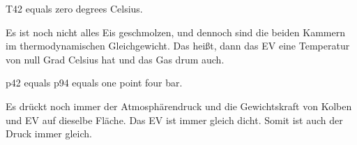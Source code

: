 T42 equals zero degrees Celsius.

Es ist noch nicht alles Eis geschmolzen, und dennoch sind die beiden Kammern im thermodynamischen Gleichgewicht. Das heißt, dann das EV eine Temperatur von null Grad Celsius hat und das Gas drum auch.

p42 equals p94 equals one point four bar.

Es drückt noch immer der Atmosphärendruck und die Gewichtskraft von Kolben und EV auf dieselbe Fläche. Das EV ist immer gleich dicht. Somit ist auch der Druck immer gleich.